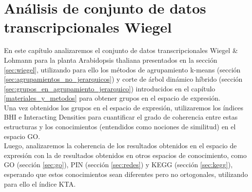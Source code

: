 \chapter{Análisis de conjunto de datos transcripcionales Wiegel}
En este capítulo analizaremos el conjunto de datos transcripcionales Wiegel \& Lohmann para la planta Arabidopsis thaliana presentados en la sección \ref{sec:wiegel}, utilizando para ello los métodos de agrupamiento k-means (sección \ref{sec:agrupamientos_no_jerarquicos}) y corte de árbol dinámico híbrido (sección \ref{sec:grupos_en_agrupamiento_jerarquico}) introducidos en el capítulo \ref{materiales_y_metodos} para obtener grupos en el espacio de expresión.\\
Una vez obtenidos los grupos en el espacio de expresión, utilizaremos los índices BHI e Interacting Densities para cuantificar el grado de coherencia entre estas estructuras y los conocimientos (entendidos como nociones de similitud) en el espacio GO.\\
Luego, analizaremos la coherencia de los resultados obtenidos en el espacio de expresión con la de resultados obtenidos en otros espacios de conocimiento, como GO (sección \ref{sec:go}), PIN  (sección \ref{sec:redes}) y KEGG (sección \ref{sec:kegg}), esperando que estos conocimientos sean diferentes pero no ortogonales, utilizando para ello el índice KTA. 

